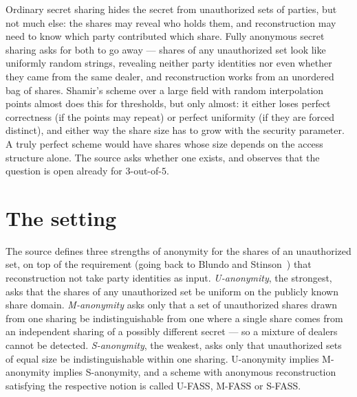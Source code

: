 \documentclass{conjura-conjecture}
\begin{document}

\vspace{0.4em}

\begin{informalconjecture}
Ordinary secret sharing hides the secret from unauthorized sets of
parties, but not much else: the shares may reveal who holds them, and
reconstruction may need to know which party contributed which share.
Fully anonymous secret sharing asks for both to go away --- shares of any
unauthorized set look like uniformly random strings, revealing neither
party identities nor even whether they came from the same dealer, and
reconstruction works from an unordered bag of shares. Shamir's scheme
over a large field with random interpolation points almost does this for
thresholds, but only almost: it either loses perfect correctness (if the
points may repeat) or perfect uniformity (if they are forced distinct),
and either way the share size has to grow with the security parameter. A
truly perfect scheme would have shares whose size depends on the access
structure alone. The source asks whether one exists, and observes that
the question is open already for $3$-out-of-$5$.
\end{informalconjecture}

\section{The setting}\label{sec:setting}

The source defines three strengths of anonymity for the shares of an
unauthorized set, on top of the requirement (going back to Blundo and
Stinson~\cite{BS97}) that reconstruction not take party identities as
input. \emph{U-anonymity}, the strongest, asks that the shares of any
unauthorized set be uniform on the publicly known share domain.
\emph{M-anonymity} asks only that a set of unauthorized shares drawn from
one sharing be indistinguishable from one where a single share comes from
an independent sharing of a possibly different secret --- so a mixture of
dealers cannot be detected. \emph{S-anonymity}, the weakest, asks only
that unauthorized sets of equal size be indistinguishable within one
sharing. U-anonymity implies M-anonymity implies S-anonymity, and a
scheme with anonymous reconstruction satisfying the respective notion is
called U-FASS, M-FASS or S-FASS\@.
\end{document}
